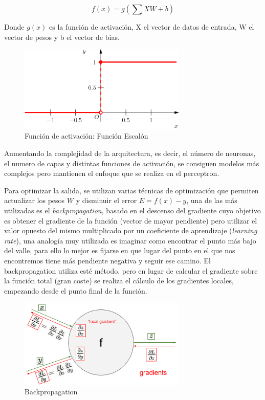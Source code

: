 \begin{equation}
    f(x) = g(\sum XW + b)
\end{equation}

Donde \(g(x)\) es la función de activación, X el vector de datos de entrada, W el vector de pesos y b el vector de bias.

\begin{figure}[H]
	\centering
	\includegraphics[width=8cm]{figs/stepfunction.png}
	\caption{Función de activación: Función Escalón}
	\label{fig:stepfunction}
\end{figure}

Aumentando la complejidad de la arquitectura, es decir, el número de neuronas, el numero de capas y distintas funciones de activación, se consiguen modelos más complejos pero mantienen el enfoque que se realiza en el perceptron.

Para optimizar la salida, se utilizan varias técnicas de optimización que permiten actualizar los pesos \(W\) y disminuir el error \(E = f(x) - y\), una de las más utilizadas es el \textit{backpropagation}, basado en el descenso del gradiente cuyo objetivo es obtener el gradiente de la función (vector de mayor pendiente) pero utilizar el valor opuesto del mismo multiplicado por un coeficiente de aprendizaje (\textit{learning rate}), una analogía muy utilizada es imaginar como encontrar el punto más bajo del valle, para ello lo mejor es fijarse en que lugar del punto en el que nos encontremos tiene más pendiente negativa y seguir ese camino. El backpropagation utiliza esté método, pero en lugar de calcular el gradiente sobre la función total (gran coste) se realiza el cálculo de los gradientes locales, empezando desde el punto final de la función.

\begin{figure}[H]
    \centering
    \includegraphics[width=8cm]{figs/backprop.png}
    \caption{Backpropagation}
    \label{fig:backprop}
\end{figure}

